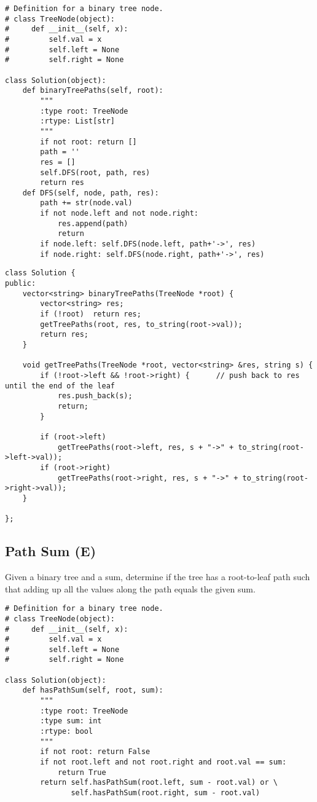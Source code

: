 \begin{lstlisting}
# Definition for a binary tree node.
# class TreeNode(object):
#     def __init__(self, x):
#         self.val = x
#         self.left = None
#         self.right = None

class Solution(object):
    def binaryTreePaths(self, root):
        """
        :type root: TreeNode
        :rtype: List[str]
        """
        if not root: return []
        path = ''
        res = []
        self.DFS(root, path, res)
        return res
    def DFS(self, node, path, res):
        path += str(node.val)
        if not node.left and not node.right: 
            res.append(path)
            return
        if node.left: self.DFS(node.left, path+'->', res)
        if node.right: self.DFS(node.right, path+'->', res)
\end{lstlisting}

\begin{lstlisting}
class Solution {
public:
    vector<string> binaryTreePaths(TreeNode *root) {
        vector<string> res;
        if (!root)  return res;
        getTreePaths(root, res, to_string(root->val));
        return res;
    }
    
    void getTreePaths(TreeNode *root, vector<string> &res, string s) {
        if (!root->left && !root->right) {      // push back to res until the end of the leaf
            res.push_back(s);
            return;
        }
        
        if (root->left)
            getTreePaths(root->left, res, s + "->" + to_string(root->left->val));
        if (root->right)
            getTreePaths(root->right, res, s + "->" + to_string(root->right->val));
    }
    
};
\end{lstlisting}


\subsection{Path Sum (E)}
Given a binary tree and a sum, determine if the tree has a root-to-leaf path such that adding up all the values along the path equals the given sum. \\

\begin{lstlisting}
# Definition for a binary tree node.
# class TreeNode(object):
#     def __init__(self, x):
#         self.val = x
#         self.left = None
#         self.right = None

class Solution(object):
    def hasPathSum(self, root, sum):
        """
        :type root: TreeNode
        :type sum: int
        :rtype: bool
        """
        if not root: return False
        if not root.left and not root.right and root.val == sum: 
            return True
        return self.hasPathSum(root.left, sum - root.val) or \
               self.hasPathSum(root.right, sum - root.val)
\end{lstlisting}

